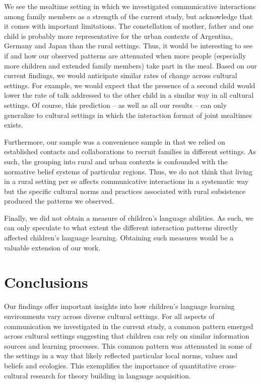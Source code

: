 \documentclass[
  man,floatsintext]{apa6}
\begin{document}
We see the mealtime setting in which we investigated communicative interactions among family members as a strength of the current study, but acknowledge that it comes with important limitations. The constellation of mother, father and one child is probably more representative for the urban contexts of Argentina, Germany and Japan than the rural settings. Thus, it would be interesting to see if and how our observed patterns are attenuated when more people (especially more children and extended family members) take part in the meal. Based on our current findings, we would anticipate similar rates of change across cultural settings. For example, we would expect that the presence of a second child would lower the rate of talk addressed to the other child in a similar way in all cultural settings. Of course, this prediction -- as well as all our results -- can only generalize to cultural settings in which the interaction format of joint mealtimes exists.

Furthermore, our sample was a convenience sample in that we relied on established contacts and collaborations to recruit families in different settings. As such, the grouping into rural and urban contexts is confounded with the normative belief systems of particular regions. Thus, we do not think that living in a rural setting per se affects communicative interactions in a systematic way but the specific cultural norms and practices associated with rural subsistence produced the patterns we observed.

Finally, we did not obtain a measure of children's language abilities. As such, we can only speculate to what extent the different interaction patterns directly affected children's language learning. Obtaining such measures would be a valuable extension of our work.

\hypertarget{conclusions}{%
\section{Conclusions}\label{conclusions}}

Our findings offer important insights into how children's language learning environments vary across diverse cultural settings. For all aspects of communication we investigated in the current study, a common pattern emerged across cultural settings suggesting that children can rely on similar information sources and learning processes. This common pattern was attenuated in some of the settings in a way that likely reflected particular local norms, values and beliefs and ecologies. This exemplifies the importance of quantitative cross-cultural research for theory building in language acquisition.
\end{document}
